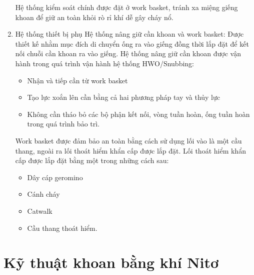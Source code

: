 \documentclass[13pt,a4paper]{article}
\begin{document}
\begin{enumerate}
		Hệ thống kiểm soát chính được đặt ở work basket, tránh xa miệng giếng khoan để giữ an toàn khỏi rò rỉ khí dễ gây cháy nổ.
		\item Hệ thống thiết bị phụ\newline
		Hệ thống nâng giữ cần khoan và work basket: Được thiết kế nhằm mục đích di chuyển ống ra vào giếng đồng thời lắp đặt để kết nối chuỗi cần khoan ra vào giếng. Hệ thống nâng giữ cần khoan được vận hành trong quá trình vận hành hệ thống HWO/Snubbing:
			\begin{itemize}
				\item Nhận và tiếp cần từ work basket
				\item Tạo lực xoắn lên cần bằng cả hai phương pháp tay và thủy lực
				\item Không cần tháo bỏ các bộ phận kết nối, vòng tuần hoàn, ống tuần hoàn trong quá trình bảo trì.
			\end{itemize}
		Work basket được đảm bảo an toàn bằng cách sử dụng lối vào là một cầu thang, ngoài ra lối thoát hiểm khẩn cấp được lắp đặt. Lối thoát hiểm khẩn cấp được lắp đặt bằng một trong những cách sau:
			\begin{itemize}
				\item Dây cáp geromino
				\item Cánh cháy
				\item Catwalk 
				\item Cầu thang thoát hiểm.
			\end{itemize}
	\end{enumerate}
\section{Kỹ thuật khoan bằng khí Nitơ}
\end{document}
